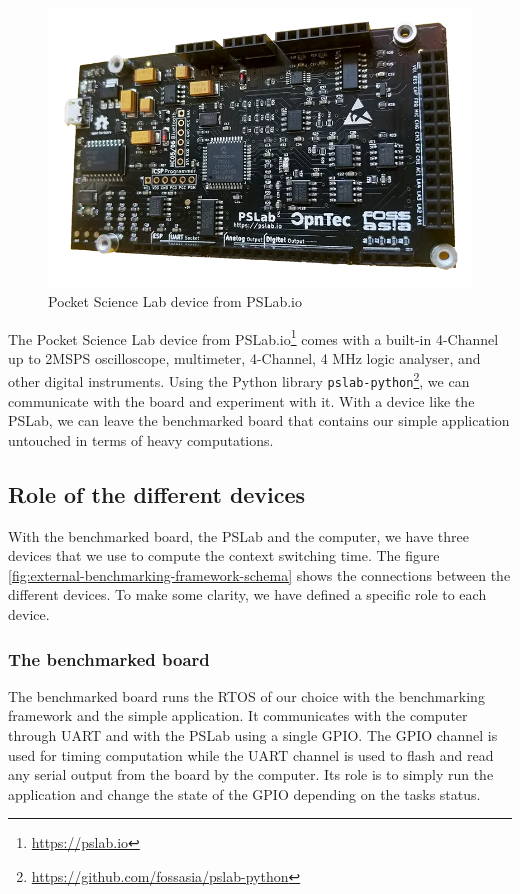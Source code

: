 \begin{figure}[!ht]
  \centering
  \includegraphics[scale=0.25]{assets/pslab.png}
  \caption{\label{fig:pslab}Pocket Science Lab device from PSLab.io}
\end{figure}

The Pocket Science Lab device from PSLab.io\footnote{\url{https://pslab.io}} comes 
  with a built-in 4-Channel up to 2MSPS oscilloscope, multimeter, 4-Channel, 4 MHz logic analyser, and other digital instruments.
Using the Python library \texttt{pslab-python}\footnote{\url{https://github.com/fossasia/pslab-python}}, we can communicate with the board and experiment with it.
With a device like the PSLab, we can leave the benchmarked board that contains our simple application untouched in terms of heavy computations.

\subsection{Role of the different devices}

With the benchmarked board, the PSLab and the computer, we have three devices that we use to compute the context switching time.
The figure \ref{fig:external-benchmarking-framework-schema} shows the connections between the different devices.
To make some clarity, we have defined a specific role to each device.

\subsubsection{The benchmarked board}
The benchmarked board runs the RTOS of our choice with the benchmarking framework and the simple application.
It communicates with the computer through UART and with the PSLab using a single GPIO.
The GPIO channel is used for timing computation while the UART channel is used to flash and read any serial output from the board by the computer.
Its role is to simply run the application and change the state of the GPIO depending on the tasks status.

